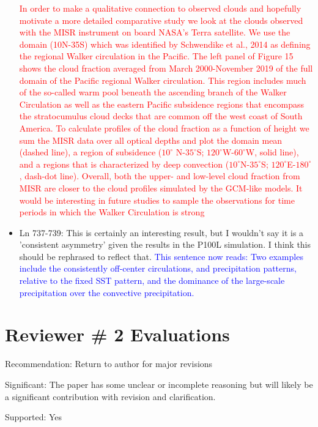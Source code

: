 \documentclass[draft]{agujournal2019}
\begin{document}
\begin{itemize}
  \textcolor{red}{In order to make a qualitative connection to observed clouds and hopefully motivate a more detailed comparative study we look at the clouds observed with the MISR instrument 
  on board NASA's Terra satellite.  We use the domain (10N-35S) which was identified by Schwendike et al., 2014 as defining the regional Walker circulation in the Pacific.  
  The left panel of Figure 15 shows the cloud fraction averaged from March 2000-November 2019 of the full domain of the Pacific regional Walker circulation.  This region 
  includes much of the so-called warm pool beneath the ascending branch of the Walker Circulation as well as the eastern Pacific subsidence regions that encompass the stratocumulus
  cloud decks that are common off the west coast of South America.   To calculate profiles of the cloud fraction as a function of height we sum the MISR data over all optical depths 
  and plot the domain mean (dashed line), a region of subsidence ($10^\circ$ N-$35^\circ$S; $120^\circ$W-$60^\circ$W, solid line), and a regions that is characterized by deep 
  convection ($10^\circ$N-$35^\circ$S; $120^\circ$E-$180^\circ$, dash-dot line).  Overall, both the upper- and low-level cloud fraction from MISR are closer to the cloud profiles 
  simulated by the GCM-like models.  It would be interesting in future studies to sample the observations for time periods in which the Walker Circulation is strong}  
  
  \item Ln 737-739: This is certainly an interesting result, but I wouldn't say it is a 'consistent asymmetry' given the results in the P100L simulation. I think this should be rephrased to reflect that.
  \textcolor{blue}{This sentence now reads: Two examples include the consistently off-center circulations, and precipitation patterns,
relative to the fixed SST pattern, and the dominance of the large-scale precipitation over the convective precipitation.}
%
\end{itemize}

\section{Reviewer \# 2 Evaluations}

Recommendation: Return to author for major revisions

Significant: The paper has some unclear or incomplete reasoning but will likely be a significant contribution with revision and clarification.

Supported: Yes
\end{document}
